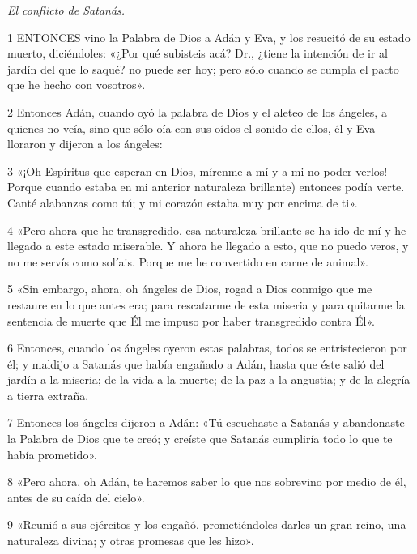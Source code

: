 \par \textit{El conflicto de Satanás.}

\par 1 ENTONCES vino la Palabra de Dios a Adán y Eva, y los resucitó de su estado muerto, diciéndoles: «¿Por qué subisteis acá? Dr., ¿tiene la intención de ir al jardín del que lo saqué? no puede ser hoy; pero sólo cuando se cumpla el pacto que he hecho con vosotros».

\par 2 Entonces Adán, cuando oyó la palabra de Dios y el aleteo de los ángeles, a quienes no veía, sino que sólo oía con sus oídos el sonido de ellos, él y Eva lloraron y dijeron a los ángeles:

\par 3 «¡Oh Espíritus que esperan en Dios, mírenme a mí y a mi no poder verlos! Porque cuando estaba en mi anterior naturaleza brillante) entonces podía verte. Canté alabanzas como tú; y mi corazón estaba muy por encima de ti».

\par 4 «Pero ahora que he transgredido, esa naturaleza brillante se ha ido de mí y he llegado a este estado miserable. Y ahora he llegado a esto, que no puedo veros, y no me servís como solíais. Porque me he convertido en carne de animal».

\par 5 «Sin embargo, ahora, oh ángeles de Dios, rogad a Dios conmigo que me restaure en lo que antes era; para rescatarme de esta miseria y para quitarme la sentencia de muerte que Él me impuso por haber transgredido contra Él».

\par 6 Entonces, cuando los ángeles oyeron estas palabras, todos se entristecieron por él; y maldijo a Satanás que había engañado a Adán, hasta que éste salió del jardín a la miseria; de la vida a la muerte; de la paz a la angustia; y de la alegría a tierra extraña.

\par 7 Entonces los ángeles dijeron a Adán: «Tú escuchaste a Satanás y abandonaste la Palabra de Dios que te creó; y creíste que Satanás cumpliría todo lo que te había prometido».

\par 8 «Pero ahora, oh Adán, te haremos saber lo que nos sobrevino por medio de él, antes de su caída del cielo».

\par 9 «Reunió a sus ejércitos y los engañó, prometiéndoles darles un gran reino, una naturaleza divina; y otras promesas que les hizo».

